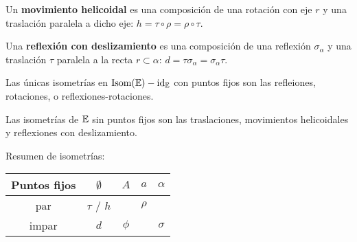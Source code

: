  Un \textbf{movimiento helicoidal} es una composición de una rotación con eje $r$ y una traslación paralela a dicho eje: $h = \tau \circ \rho = \rho \circ \tau$.
 
 Una \textbf{reflexión con deslizamiento} es una composición de una reflexión $\sigma_\alpha$ y una traslación $\tau$ paralela a la recta $r \subset \alpha$: $d = \tau\sigma_\alpha = \sigma_\alpha\tau$.


 Las únicas isometrías en $\text{Isom}{(\mathbb{E})}- \text{id}_{\mathbb{E}}$ con puntos fijos son las refleiones, rotaciones, o reflexiones-rotaciones.

 Las isometrías de $\mathbb{E}$ sin puntos fijos son las traslaciones, movimientos helicoidales y reflexiones con deslizamiento.

 Resumen de isometrías:

\begin{tabular}{ccccc}
	Puntos fijos & $\emptyset$ & $A$ & $a$ & $\alpha$\\ \midrule
	par  & $\tau$ /  $h$ & & $\rho$ & \\
	impar & $d$ & $\phi$ & & $\sigma$ \\
\end{tabular}
